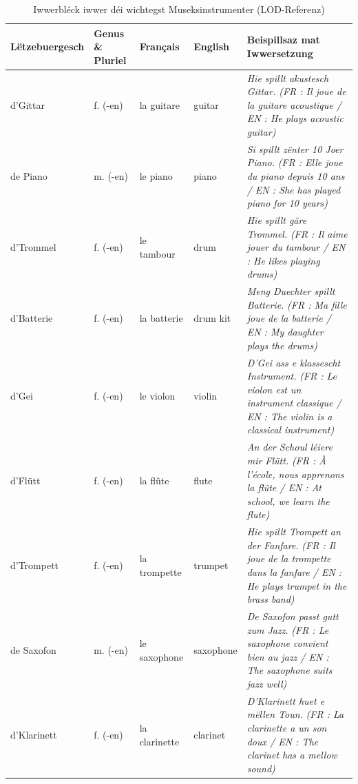 \begin{table}[htbp]
    \centering
    \begin{tabular}{p{2.1cm}p{2.2cm}p{2.2cm}p{2.0cm}p{6.5cm}}
        \toprule
        \textbf{Lëtzebuergesch} & \textbf{Genus \& Pluriel} & \textbf{Français} & \textbf{English} & \textbf{Beispillsaz mat Iwwersetzung} \\
        \midrule
        d'Gittar & f. (-en) & la guitare & guitar & \textit{Hie spillt akustesch Gittar.} \newline \footnotesize\textit{(FR : Il joue de la guitare acoustique / EN : He plays acoustic guitar)} \\
        \midrule
        de Piano & m. (-en) & le piano & piano & \textit{Si spillt zënter 10 Joer Piano.} \newline \footnotesize\textit{(FR : Elle joue du piano depuis 10 ans / EN : She has played piano for 10 years)} \\
        \midrule
        d'Trommel & f. (-en) & le tambour & drum & \textit{Hie spillt gäre Trommel.} \newline \footnotesize\textit{(FR : Il aime jouer du tambour / EN : He likes playing drums)} \\
        \midrule
        d'Batterie & f. (-en) & la batterie & drum kit & \textit{Meng Duechter spillt Batterie.} \newline \footnotesize\textit{(FR : Ma fille joue de la batterie / EN : My daughter plays the drums)} \\
        \midrule
        d'Gei & f. (-en) & le violon & violin & \textit{D'Gei ass e klassescht Instrument.} \newline \footnotesize\textit{(FR : Le violon est un instrument classique / EN : The violin is a classical instrument)} \\
        \midrule
        d'Flütt & f. (-en) & la flûte & flute & \textit{An der Schoul léiere mir Flütt.} \newline \footnotesize\textit{(FR : À l'école, nous apprenons la flûte / EN : At school, we learn the flute)} \\
        \midrule
        d'Trompett & f. (-en) & la trompette & trumpet & \textit{Hie spillt Trompett an der Fanfare.} \newline \footnotesize\textit{(FR : Il joue de la trompette dans la fanfare / EN : He plays trumpet in the brass band)} \\
        \midrule
        de Saxofon & m. (-en) & le saxophone & saxophone & \textit{De Saxofon passt gutt zum Jazz.} \newline \footnotesize\textit{(FR : Le saxophone convient bien au jazz / EN : The saxophone suits jazz well)} \\
        \midrule
        d'Klarinett & f. (-en) & la clarinette & clarinet & \textit{D'Klarinett huet e mëllen Toun.} \newline \footnotesize\textit{(FR : La clarinette a un son doux / EN : The clarinet has a mellow sound)} \\
        \bottomrule
    \end{tabular}
    \caption{Iwwerbléck iwwer déi wichtegst Museksinstrumenter (LOD-Referenz)}
\end{table}

